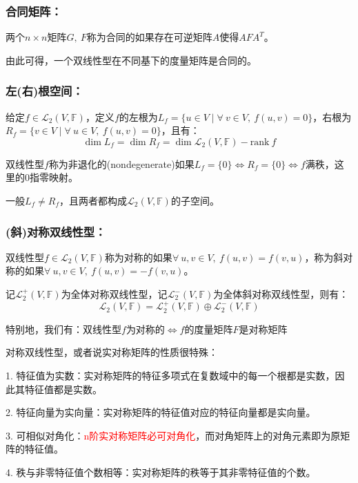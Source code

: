 \documentclass[zihao=-4,UTF8]{report}
\theoremstyle{mystyle} %
\begin{document}
\subsubsection{合同矩阵：}
两个$n\times n $矩阵$G,\ F$称为合同的如果存在可逆矩阵$A$使得$AFA^T$。\par{\color{gray}\small 由此可得，一个双线性型在不同基下的度量矩阵是合同的。}

\subsubsection{左(右)根空间：}
给定$f \in \mathcal{L}_2(V,\mathbb{F})$，定义$f$的左根为$L_f = \{u \in V \mid \forall\ v \in V,\ f(u,v) = 0\}$，右根为$R_f = \{v \in V \mid \forall\ u \in V,\ f(u,v) = 0\}$，且有：
\begin{equation*}
    \dim L_f = \dim R_f = \dim \mathcal{L}_2(V,\mathbb{F}) - \text{rank}\ f
\end{equation*}\par
双线性型$f$称为非退化的(nondegenerate)如果$L_f = \{0\} \Longleftrightarrow R_f = \{0\} \Longleftrightarrow f\text{满秩}$，这里的0指零映射。\par
{\color{gray}\small  一般$L_f \ne R_f$，且两者都构成$ \mathcal{L}_2(V,\mathbb{F})$的子空间。}

\subsubsection{(斜)对称双线性型：}
双线性型$f\in \mathcal{L}_2(V,\mathbb{F})$称为对称的如果$\forall\  u,v \in V,\ f(u,v) = f(v,u)$，称为斜对称的如果$\forall\  u,v \in V,\ f(u,v) = -f(v,u)$。\par 
记$\mathcal{L}_2^+(V,\mathbb{F})$为全体对称双线性型，记$\mathcal{L}_2^-(V,\mathbb{F})$为全体斜对称双线性型，则有：
\begin{equation*}
    \mathcal{L}_2(V,\mathbb{F}) = \mathcal{L}_2^+(V,\mathbb{F}) \oplus \mathcal{L}_2^-(V,\mathbb{F})
\end{equation*}\par
特别地，我们有：双线性型$f$为对称的$\Longleftrightarrow  f$的度量矩阵$F$是对称矩阵
{\par\color{gray}\small
对称双线性型，或者说实对称矩阵的性质很特殊：\par
1. 特征值为实数：实对称矩阵的特征多项式在复数域中的每一个根都是实数，因此其特征值都是实数。
\par2. 特征向量为实向量：实对称矩阵的特征值对应的特征向量都是实向量。\par
3. 可相似对角化：\textcolor{red}{n阶实对称矩阵必可对角化}，而对角矩阵上的对角元素即为原矩阵的特征值。\par
4. 秩与非零特征值个数相等：实对称矩阵的秩等于其非零特征值的个数。
\par}
\end{document}
